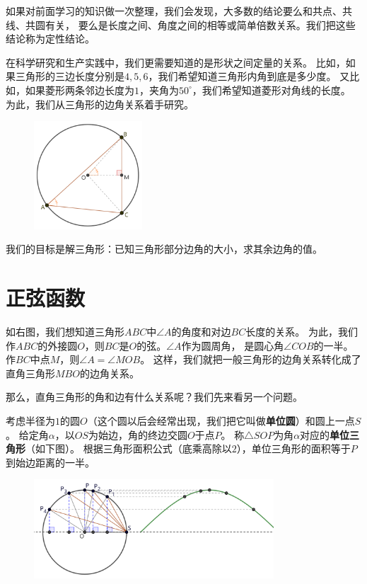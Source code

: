 \documentclass[12pt,UTF8]{ctexbook}
\begin{document}
如果对前面学习的知识做一次整理，我们会发现，大多数的结论要么和共点、共线、共圆有关，
要么是长度之间、角度之间的相等或简单倍数关系。我们把这些结论称为定性结论。

在科学研究和生产实践中，我们更需要知道的是形状之间定量的关系。
比如，如果三角形的三边长度分别是$4,5,6$，我们希望知道三角形内角到底是多少度。
又比如，如果菱形两条邻边长度为$1$，夹角为$50^\circ$，我们希望知道菱形对角线的长度。
为此，我们从三角形的边角关系着手研究。

\begin{figure} %
    \vspace{-0pt}
    \flushright
    \includegraphics[width=0.36\textwidth]{tu/三角函数1.png}
\end{figure}
我们的目标是解三角形：已知三角形部分边角的大小，求其余边角的值。

\section{正弦函数}
如右图，我们想知道三角形$ABC$中$\angle A$的角度和对边$BC$长度的关系。
为此，我们作$ABC$的外接圆$O$，则$BC$是$O$的弦。$\angle A$作为圆周角，
是圆心角$\angle COB$的一半。作$BC$中点$M$，则$\angle A = \angle MOB$。
这样，我们就把一般三角形的边角关系转化成了直角三角形$MBO$的边角关系。

那么，直角三角形的角和边有什么关系呢？我们先来看另一个问题。

考虑半径为$1$的圆$O$（这个圆以后会经常出现，我们把它叫做\textbf{单位圆}）和圆上一点$S$。
给定角$\alpha$，以$OS$为始边，角的终边交圆$O$于点$P$。
称$\triangle SOP$为角$\alpha$对应的\textbf{单位三角形}（如下图）。
根据三角形面积公式（底乘高除以$2$），单位三角形的面积等于$P$到始边距离的一半。

\begin{figure}[H] %
    \vspace{4pt}
    \centering
    \includegraphics[width=0.8\textwidth]{tu/三角函数2.png}
\end{figure}
\end{document}
